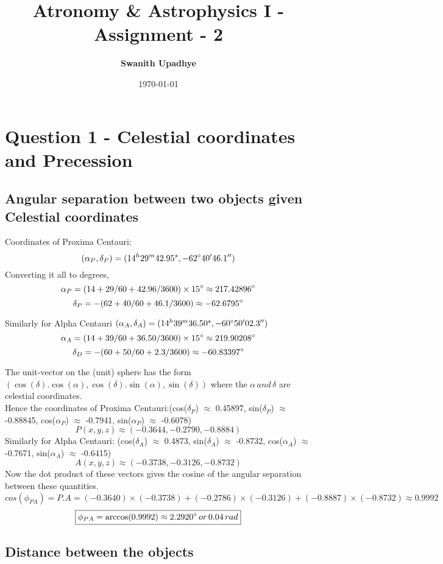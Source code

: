 \documentclass[11pt]{article}
\title{Atronomy \& Astrophysics I -  Assignment - 2}
\author{\textbf{\Large Swanith Upadhye}}
\date{\today}
\begin{document}
	
	\maketitle
	\noindent\hrulefill
	\Large
	
	\section*{\color{teal} Question 1 - Celestial coordinates and Precession}
	
	\subsection{Angular separation between two objects given Celestial coordinates}
	
	Coordinates of Proxima Centauri:
	\[
	(\alpha_P , \delta_P) = (14^h 29^m 42.95^s, -62\degree 40' 46.1'')
	\]
	Converting it all to degrees,
	\[
	\alpha_P = (14 + 29/60 + 42.96/3600) \times 15\degree \approx 217.42896 \degree
	\]
	\[
	\delta_P = -(62 + 40/60 + 46.1/3600) \approx -62.6795\degree
	\]
	
	Similarly for Alpha Centauri $(\alpha_A, \delta_A) = (14^h 39^m 36.50^s , -60\degree50'02.3'')$
	\[
	\alpha_A = (14 + 39/60 + 36.50/3600) \times 15 \degree \approx 219.90208 \degree
	\]
	\[
	\delta_D = -(60+50/60+2.3/3600) \approx -60.83397 \degree
	\]
	
	The unit-vector on the (unit) sphere has the form $(\cos(\delta).\cos(\alpha),\cos(\delta).\sin(\alpha), \sin(\delta))$ where the $\alpha \, and \, \delta $ are celestial coordinates.\\
	
	Hence the coordinates of Proxima Centauri:(cos($\delta_P$) $\approx$ 0.45897, sin($\delta_P$) $\approx$ -0.88845, cos($\alpha_P$) $\approx$ -0.7941, sin($\alpha_P$) $\approx$ -0.6078)
	\[
	P(x,y,z) \approx (-0.3644, -0.2790, -0.8884)
	\]
	Similarly for Alpha Centauri: (cos($\delta_A$) $\approx$ 0.4873, sin($\delta_A$) $\approx$ -0.8732, cos($\alpha_A$) $\approx$ -0.7671, sin($\alpha_A$) $\approx$ -0.6415)
	\[
	A(x,y,z) \approx (-0.3738, -0.3126, -0.8732)
	\]
	Now the dot product of these vectors gives the cosine of the angular separation between these quantities.
	\[
	cos(\phi_{PA}) = P.A =  (-0.3640) \times (-0.3738) + (-0.2786) \times (-0.3126) + (-0.8887) \times (-0.8732) \approx 0.9992
	\]
	\[
	\boxed{\phi_{PA} = \arccos(0.9992) \approx 2.2920\degree \, or \, 0.04 \,rad}
	\]
	
	\subsection{Distance between the objects}
	
\end{document}
